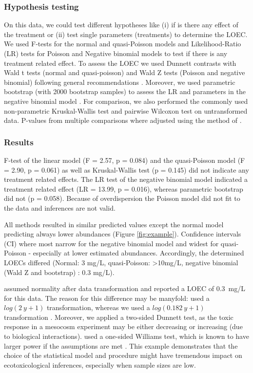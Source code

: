 \documentclass{scrartcl}
\begin{document}
\subsubsection{Hypothesis testing}

On this data, we could test different hypotheses like (i) if is there any effect of the treatment or (ii) test single parameters (treatments) to determine the LOEC.
We used F-tests for the normal and quasi-Poisson models and Likelihood-Ratio (LR) tests for Poisson and Negative binomial models to test if there is any treatment related effect.
To assess the LOEC we used Dunnett contrasts with Wald t tests (normal and quasi-poisson) and Wald Z tests (Poisson and negative binomial) following general recommendations \citep{bolker_generalized_2009}. 
Moreover, we used parametric bootstrap (with 2000 bootstrap samples) to assess the LR and parameters in the negative binomial model \citep{faraway_extending_2006}.
For comparison, we also performed the commonly used non-parametric Kruskal-Wallis test and pairwise Wilcoxon test on untransformed data.
P-values from multiple comparisons where adjusted using the method of \citet{holm_simple_1979}.


\subsubsection{Results}
F-test of the linear model  (F = 2.57, p = 0.084) and the quasi-Poisson model (F = 2.90, p = 0.061) as well as Kruskal-Wallis test (p = 0.145) did not indicate any treatment related effects.
The LR test of the negative binomial model indicated a treatment related effect (LR = 13.99, p = 0.016), whereas parametric bootstrap did not (p = 0.058).
Because of overdispersion the Poisson model did not fit to the data and inferences are not valid. 

All methods resulted in similar predicted values except the normal model predicting always lower abundances (Figure \ref{fig:example}). 
Confidence intervals (CI) where most narrow for the negative binomial model and widest for quasi-Poisson - especially at lower estimated abundances.
Accordingly, the determined LOECs differed (Normal: 3 mg/L, quasi-Poisson: \textgreater 10mg/L, negative binomial (Wald Z and bootstrap) : 0.3 mg/L).

\citet{brock_minimum_2014} assumed normality after data transformation and reported a LOEC of \mbox{0.3 mg/L} for this data.
The reason for this difference may be manyfold: \citep{brock_minimum_2014} used a $log(2~y + 1)$ transformation, whereas we used a $log(0.182~y + 1)$ transformation \citep{van_den_brink_impact_2000}.
Moreover, we applied a two-sided Dunnett test, as the toxic response in a mesocosm experiment may be either decreasing or increasing (due to biological interactions).
\citet{brock_minimum_2014} used a one-sided Williams test, which is known to have larger power if the assumptions are met \citep{jaki_statistical_2013}.
This example demonstrates that the choice of the statistical model and procedure might have tremendous impact on ecotoxicological inferences, especially when sample sizes are low.
\end{document}

